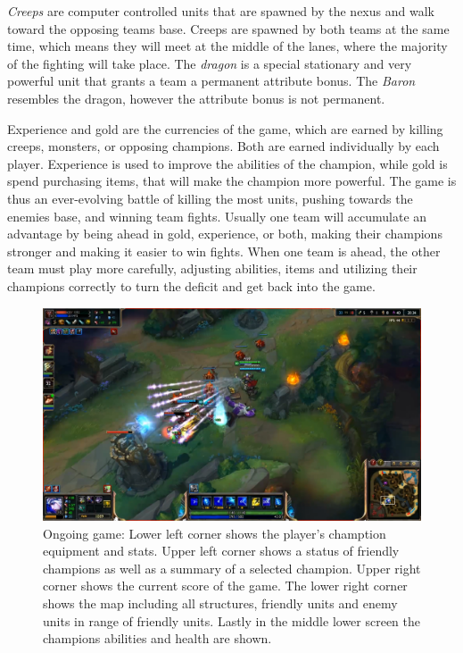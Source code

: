 \emph{Creeps} are computer controlled units that are spawned by the nexus and walk toward the opposing teams base. Creeps are spawned by both teams at the same time, which means they will meet at the middle of the lanes, where the majority of the fighting will take place. The \emph{dragon} is a special stationary and very powerful unit that grants a team a permanent attribute bonus. The \emph{Baron} resembles the dragon, however the attribute bonus is not permanent.

Experience and gold are the currencies of the game, which are earned by killing creeps, monsters, or opposing champions. Both are earned individually by each player. Experience is used to improve the abilities of the champion, while gold is spend purchasing items, that will make the champion more powerful. The game is thus an ever-evolving battle of killing the most units, pushing towards the enemies base, and winning team fights. Usually one team will accumulate an advantage by being ahead in gold, experience, or both, making their champions stronger and making it easier to win fights. When one team is ahead, the other team must play more carefully, adjusting abilities, items and utilizing their champions correctly to turn the deficit and get back into the game.

\begin{figure}[!htb]
  \centering
    \includegraphics[width=1\textwidth]{img/lolgame.png}
  \caption{Ongoing game: Lower left corner shows the player's chamption equipment and stats. Upper left corner shows a status of friendly champions as well as a summary of a selected champion. Upper right corner shows the current score of the game. The lower right corner shows the map including all structures, friendly units and enemy units in range of friendly units. Lastly in the middle lower screen the champions abilities and health are shown.}\label{fig:lolgame}
\end{figure}

